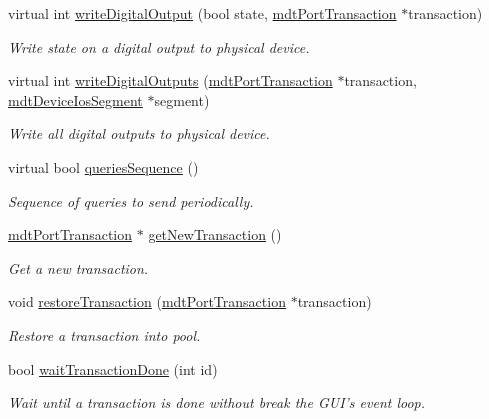 \begin{DoxyCompactItemize}
virtual int \hyperlink{classmdt_device_a0fbe57503d86554829e708b2b83d73f1}{write\-Digital\-Output} (bool state, \hyperlink{classmdt_port_transaction}{mdt\-Port\-Transaction} $\ast$transaction)
\begin{DoxyCompactList}\small\item\em Write state on a digital output to physical device. \end{DoxyCompactList}\item 
virtual int \hyperlink{classmdt_device_ae644ab1ef0ebb57d6d9d502829907ec1}{write\-Digital\-Outputs} (\hyperlink{classmdt_port_transaction}{mdt\-Port\-Transaction} $\ast$transaction, \hyperlink{classmdt_device_ios_segment}{mdt\-Device\-Ios\-Segment} $\ast$segment)
\begin{DoxyCompactList}\small\item\em Write all digital outputs to physical device. \end{DoxyCompactList}\item 
virtual bool \hyperlink{classmdt_device_acba50968d201ad95c4eaa2ab2ed48b4f}{queries\-Sequence} ()
\begin{DoxyCompactList}\small\item\em Sequence of queries to send periodically. \end{DoxyCompactList}\item 
\hyperlink{classmdt_port_transaction}{mdt\-Port\-Transaction} $\ast$ \hyperlink{classmdt_device_a0e57cc8b749581cff447d514b9a1ff8e}{get\-New\-Transaction} ()
\begin{DoxyCompactList}\small\item\em Get a new transaction. \end{DoxyCompactList}\item 
void \hyperlink{classmdt_device_a4619d8be240cafe48865a89f7424de92}{restore\-Transaction} (\hyperlink{classmdt_port_transaction}{mdt\-Port\-Transaction} $\ast$transaction)
\begin{DoxyCompactList}\small\item\em Restore a transaction into pool. \end{DoxyCompactList}\item 
bool \hyperlink{classmdt_device_ab937015c1a319b7234442a4cc29a02a8}{wait\-Transaction\-Done} (int id)
\begin{DoxyCompactList}\small\item\em Wait until a transaction is done without break the G\-U\-I's event loop. \end{DoxyCompactList}\end{DoxyCompactItemize}

